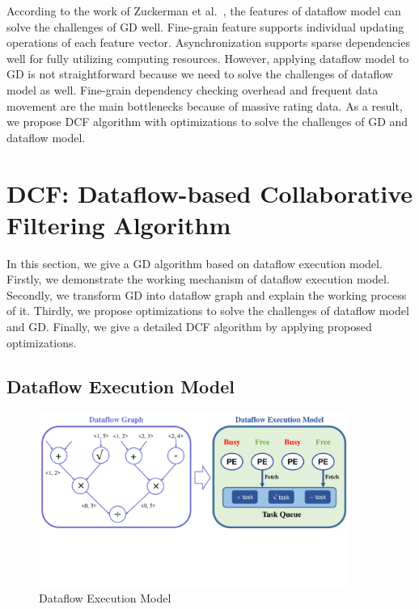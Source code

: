 \documentclass{llncs}
\begin{document}
According to the work of Zuckerman et al.~\cite{codelet},
the features of dataflow model can solve the challenges of GD well. Fine-grain feature supports individual updating operations of each feature vector. Asynchronization supports sparse dependencies well for fully utilizing computing resources. However, applying dataflow model to GD is not straightforward because we need to solve the challenges of dataflow model as well. Fine-grain dependency checking overhead and frequent data movement are the main bottlenecks because of massive rating data. As a result, we propose DCF algorithm with optimizations to solve the challenges of GD and dataflow model.

\vspace{-10pt}
\section{DCF: Dataflow-based Collaborative Filtering Algorithm}
\vspace{-10pt}

In this section, we give a GD algorithm based on dataflow execution model. Firstly, we demonstrate the working mechanism of dataflow execution model. Secondly, we transform GD into dataflow graph and explain the working process of it. Thirdly, we propose optimizations to solve the challenges of dataflow model and GD. Finally, we give a detailed DCF algorithm by applying proposed optimizations.
\vspace{-10pt}
\subsection{Dataflow Execution Model}
\vspace{-5pt}

\begin{figure}[!t]
\centering
\includegraphics[width=4in]{pics/dataflowModel.pdf}
\vspace{-60pt}
\caption{Dataflow Execution Model}
\label{fig:dataflowModel}
\vspace{-15pt}
\end{figure}
\end{document}
